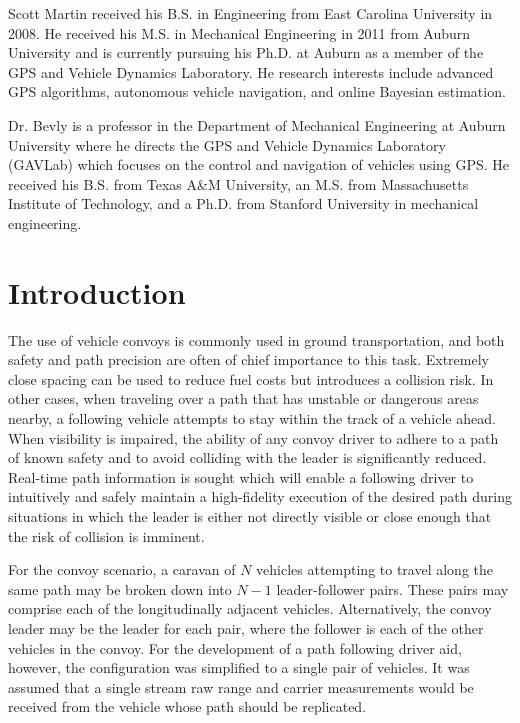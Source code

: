 \documentclass[twocolumn,10pt]{article}
\begin{document}
  Scott Martin received his B.S. in Engineering from East Carolina University in 2008. He received his M.S. in Mechanical Engineering in 2011 from Auburn University and is currently pursuing his Ph.D. at Auburn as a member of the GPS and Vehicle Dynamics Laboratory. He research interests include advanced GPS algorithms, autonomous vehicle navigation, and online Bayesian estimation. 

  Dr. Bevly is a professor in the Department of Mechanical Engineering at Auburn University where he directs the GPS and Vehicle Dynamics Laboratory (GAVLab) which focuses on the control and navigation of vehicles using GPS.  He received his B.S. from Texas A\&M University, an M.S. from Massachusetts Institute of Technology, and a Ph.D. from Stanford University in mechanical engineering. 


\section*{Introduction}

  The use of vehicle convoys is commonly used in ground transportation, and both safety and path precision are often of chief importance to this task.  Extremely close spacing can be used to reduce fuel costs but introduces a collision risk.  In other cases, when traveling over a path that has unstable or dangerous areas nearby, a following vehicle attempts to stay within the track of a vehicle ahead.  When visibility is impaired, the ability of any convoy driver to adhere to a path of known safety and to avoid colliding with the leader is significantly reduced.  Real-time path information is sought which will enable a following driver to intuitively and safely maintain a high-fidelity execution of the desired path during situations in which the leader is either not directly visible or close enough that the risk of collision is imminent.

  For the convoy scenario, a caravan of $N$ vehicles attempting to travel along the same path may be broken down into $N-1$ leader-follower pairs.  These pairs may comprise each of the longitudinally adjacent vehicles.  Alternatively, the convoy leader may be the leader for each pair, where the follower is each of the other vehicles in the convoy.  For the development of a path following driver aid, however, the configuration was simplified to a single pair of vehicles.  It was assumed that a single stream raw range and carrier measurements would be received from the vehicle whose path should be replicated.
\end{document}
